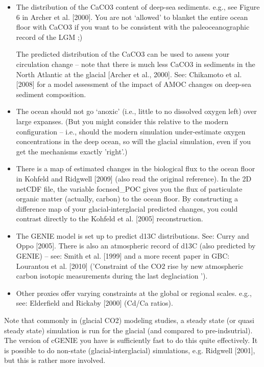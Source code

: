 \documentclass[11pt,fleqn]{book} %
\begin{document}
\begin{itemize}[noitemsep]

\item 
The distribution of the CaCO3 content of deep-sea sediments. e.g., see Figure 6 in Archer
et al. [2000]. You are not ‘allowed’ to blanket the entire ocean floor with CaCO3 if you want
to be consistent with the paleoceanographic record of the LGM ;)

The predicted distribution of the CaCO3 can be used to assess your circulation change –
note that there is much less CaCO3 in sediments in the North Atlantic at the glacial [Archer
et al., 2000]. See: Chikamoto et al. [2008] for a model assessment of the impact of AMOC
changes on deep-sea sediment composition.

\item 
The ocean should not go ‘anoxic’ (i.e., little to no dissolved oxygen left) over large
expanses. (But you might consider this relative to the modern configuration – i.e., should
the modern simulation under-estimate oxygen concentrations in the deep ocean, so will the
glacial simulation, even if you get the mechanisms exactly 'right'.)

\item 
There is a map of estimated changes in the biological flux to the ocean floor in Kohfeld and
Ridgwell [2009] (also read the original reference). In the 2D netCDF file, the variable
focnsed\_POC gives you the flux of particulate organic matter (actually, carbon) to the ocean
floor. By constructing a difference map of your glacial-interglacial predicted changes, you
could contrast directly to the Kohfeld et al. [2005] reconstruction.

\item 
The GENIE model is set up to predict d13C distributions. See: Curry and Oppo [2005].
There is also an atmospheric record of d13C (also predicted by GENIE) – see: Smith et al.
[1999] and a more recent paper in GBC: Lourantou et al. [2010] ('Constraint of the CO2 rise
by new atmospheric carbon isotopic measurements during the last deglaciation ').

\item Other proxies offer varying constraints at the global or regional scales. e.g., see: Elderfield
and Rickaby [2000] (Cd/Ca ratios).

\end{itemize}

Note that commonly in (glacial CO2) modeling studies, a steady state (or quasi steady state)
simulation is run for the glacial (and compared to pre-indsutrial). The version of cGENIE you have
is sufficiently fast to do this quite effectively. It is possible to do non-state (glacial-interglacial)
simulations, e.g. Ridgwell [2001], but this is rather more involved.
\end{document}
